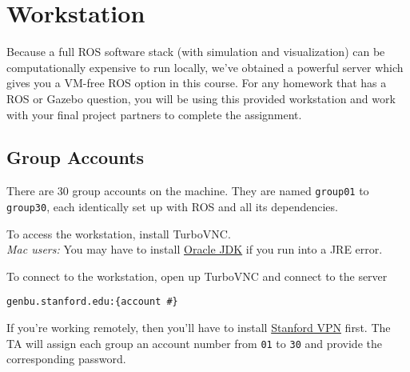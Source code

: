\section{Workstation}
Because a full ROS software stack (with simulation and visualization) can be computationally expensive to run locally, we've obtained a powerful server which gives you a VM-free ROS option in this course. For any homework that has a ROS or Gazebo question, you will be using this provided workstation and work with your final project partners to complete the assignment.


\subsection*{Group Accounts}
There are 30 group accounts on the machine. They are named \texttt{group01} to \texttt{group30}, each identically set up with ROS and all its dependencies.

To access the workstation, install TurboVNC.\\
\emph{Mac users:} You may have to install \href{https://www.oracle.com/java/technologies/javase-jdk15-downloads.html}{Oracle JDK} if you run into a JRE error.

To connect to the workstation, open up TurboVNC and connect to the server
\begin{lstlisting}
genbu.stanford.edu:{account #}
\end{lstlisting}
If you're working remotely, then you'll have to install \href{https://uit.stanford.edu/service/vpn}{Stanford VPN} first.
The TA will assign each group an account number from \texttt{01} to \texttt{30} and provide the corresponding password.

